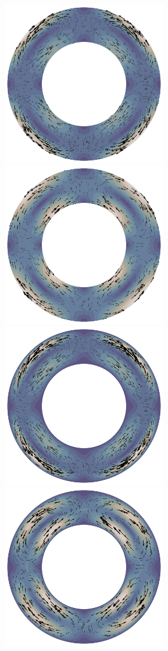 \documentclass[12pt]{article}
\numberwithin{equation}{subsection}
\begin{document}
\begin{figure}[!htb]
	\begin{multicols}{4}
		\includegraphics[width=7cm]{./case1/vel_uw.png}\par
		\hspace{0.75in}
		\includegraphics[width=7cm]{./case2/vel_uw.png}\par
		\hspace{1.5in}
		\includegraphics[width=7cm]{./case3/vel_uw.png}\par
		\hspace{2.25in}
		\includegraphics[width=7cm]{./case4/vel_uw.png}

\end{multicols}
\end{figure}
\end{document}
